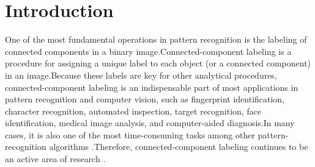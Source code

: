 \section{Introduction}

One of the most fundamental operations in pattern recognition is the labeling of connected components in a binary image.Connected-component labeling is a procedure for assigning a unique label to each object (or a connected component) in an image.Because these labels are key for other analytical procedures, connected-component labeling is an indispensable part of most applications in pattern recognition and computer vision, such as fingerprint identification, character recognition, automated inspection, target recognition, face identification, medical image analysis, and computer-aided diagnosis.In many cases, it is also one of the most time-consuming tasks among other pattern-recognition algorithms \cite{Alnuweiri1992_Parallel}.Therefore, connected-component labeling continues to be an active area of research \cite{Gonzales_Digital,Agarwal2006_Efficient,Chang2004_Linear,Hayashi2001_Fast,Hu2005_Fast,Knop1998_Parallel,Moga1997_Parallel,Wang2003_Parallel,}.
